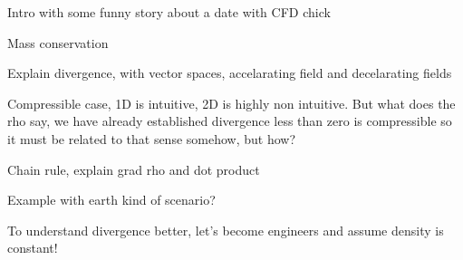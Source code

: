 \documentclass{article}
\begin{document}
Intro with some funny story about a date with CFD chick

Mass conservation

Explain divergence, with vector spaces, accelarating field and decelarating fields

Compressible case, 1D is intuitive, 2D is highly non intuitive.
But what does the rho say, we have already established divergence less than zero is compressible so it must be related to that sense somehow, but how?

Chain rule, explain grad rho and dot product

Example with earth kind of scenario?



To understand divergence better, let's become engineers and assume density is constant!
\end{document}
